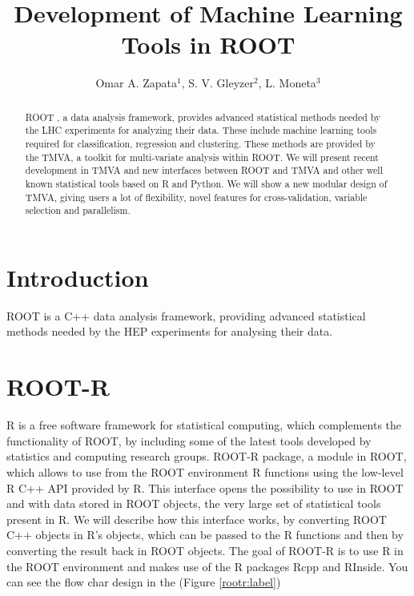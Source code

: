 \documentclass[a4paper]{jpconf}
\begin{document}
\title{Development of Machine Learning Tools in ROOT}

\author{Omar A. Zapata$^1$, S. V. Gleyzer$^2$, L. Moneta$^3$}

\address{$^1$,University of Antioquia and Metropolitan Institute of Technology, PH/STF Dep.}
\address{$^2$,University of Florida and CERN, PH/STF Dep.}
\address{$^3$,CERN, PH/STF Dep.}


\begin{abstract}
ROOT , a data analysis framework, provides advanced statistical methods needed by the LHC experiments for analyzing their data. These include machine learning tools required for classification, regression and clustering. These methods are provided by the TMVA, a toolkit for multi-variate analysis within ROOT. We will present recent development in TMVA and new interfaces between ROOT and TMVA and other well known statistical tools based on R and Python.
We will show a new modular design of TMVA, giving users a lot of flexibility, novel features for cross-validation, variable selection and parallelism.
\end{abstract}

\section{Introduction}
ROOT \cite{Antcheva20092499} is  a C++ data analysis framework, providing advanced statistical methods needed by the HEP experiments for analysing their data. 

\section{ROOT-R}
R \cite{R} is a free software framework for statistical computing, which complements the functionality of ROOT, by including some of the latest tools developed by statistics and computing research groups. 
ROOT-R package, a module in ROOT, which allows to use from the ROOT environment R functions using the low-level R C++ API provided by R. 
This interface opens the possibility to use in ROOT and with data stored in ROOT objects, the very large set of statistical tools present in  R. 
We will describe how this interface works, by converting ROOT C++ objects in R’s objects, which can be passed to the  R functions and then by converting the result back in ROOT objects. 
The goal of ROOT-R is to use R in the ROOT environment and makes use of the R packages Rcpp and RInside.
You can see the flow char design in the (Figure \ref{rootr:label})
\end{document}

